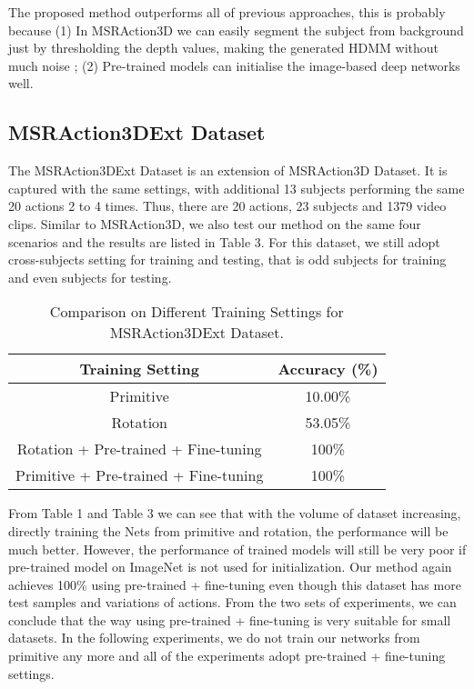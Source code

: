 \documentclass[conference]{IEEEtran}
\begin{document}
The proposed method outperforms all of previous approaches, this is probably because (1) In MSRAction3D we can easily segment the subject from background just by thresholding the depth values, making the generated HDMM without much noise ; (2) Pre-trained models can initialise the image-based deep networks well.

\subsection{MSRAction3DExt Dataset}
The MSRAction3DExt Dataset is an extension of MSRAction3D Dataset. It is captured with the same settings, with additional 13 subjects performing the same 20 actions 2 to 4 times. Thus, there are 20 actions, 23 subjects and 1379 video clips.
Similar to MSRAction3D, we also test our method on the same four scenarios and the results are listed in Table 3. For this dataset, we still adopt cross-subjects setting for training and testing, that is odd subjects for training and even subjects for testing.   

\begin{table}[h]
\centering
\caption{Comparison on Different Training Settings for MSRAction3DExt Dataset.}
\begin{tabular}{|c|c|}
\hline
Training Setting & Accuracy (\%)\\
\hline
Primitive & 10.00\%  \\
\hline
Rotation & 53.05\%\\
\hline
Rotation + Pre-trained + Fine-tuning & 100\%  \\
\hline
Primitive + Pre-trained + Fine-tuning & 100\%  \\
\hline
\end{tabular}
\end{table} 
From Table 1 and Table 3 we can see that with the volume of dataset increasing, directly training the Nets from primitive and rotation, the performance will be much better. However, the performance of trained models will still be very poor if pre-trained model on ImageNet is not used for initialization. Our method again achieves 100\% using pre-trained + fine-tuning even though this dataset has more test samples and variations of actions.
From the two sets of experiments, we can conclude that the way using pre-trained + fine-tuning is very suitable for small datasets. 
In the following experiments, we do not train our networks from primitive any more and all of the experiments adopt pre-trained + fine-tuning settings. 
\end{document}
